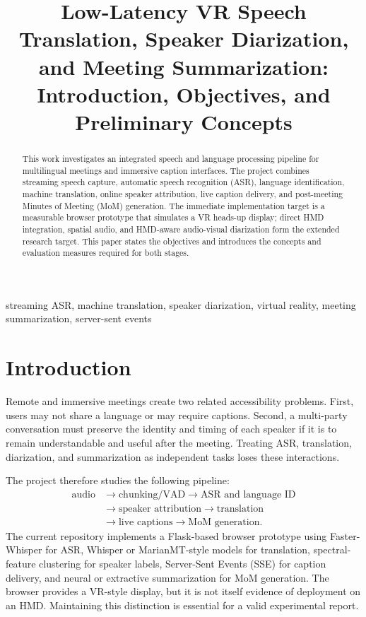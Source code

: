 \documentclass[conference]{IEEEtran}
\title{Low-Latency VR Speech Translation, Speaker Diarization, and Meeting Summarization: Introduction, Objectives, and Preliminary Concepts}
\author{
\IEEEauthorblockN{Abhiraj Bhatta (23BAI0089), Piyush Priyadarsi Panda (23BAI0134), Rajesh Mundhe (23BAI0112),\\
Varun Suresh (23BAI0097), and Simran Rawat (23BAI0090)}
\IEEEauthorblockA{Vellore Institute of Technology, Vellore, Tamil Nadu, India}
}
\begin{document}
\maketitle

\begin{abstract}
This work investigates an integrated speech and language processing pipeline for multilingual meetings and immersive caption interfaces. The project combines streaming speech capture, automatic speech recognition (ASR), language identification, machine translation, online speaker attribution, live caption delivery, and post-meeting Minutes of Meeting (MoM) generation. The immediate implementation target is a measurable browser prototype that simulates a VR heads-up display; direct HMD integration, spatial audio, and HMD-aware audio-visual diarization form the extended research target. This paper states the objectives and introduces the concepts and evaluation measures required for both stages.
\end{abstract}

\begin{IEEEkeywords}
streaming ASR, machine translation, speaker diarization, virtual reality, meeting summarization, server-sent events
\end{IEEEkeywords}

\section{Introduction}
Remote and immersive meetings create two related accessibility problems. First, users may not share a language or may require captions. Second, a multi-party conversation must preserve the identity and timing of each speaker if it is to remain understandable and useful after the meeting. Treating ASR, translation, diarization, and summarization as independent tasks loses these interactions.

The project therefore studies the following pipeline:
\begin{equation}
\begin{split}
\text{audio} &\rightarrow \text{chunking/VAD} \rightarrow \text{ASR and language ID}\\
&\rightarrow \text{speaker attribution} \rightarrow \text{translation}\\
&\rightarrow \text{live captions} \rightarrow \text{MoM generation}.
\end{split}
\end{equation}
The current repository implements a Flask-based browser prototype using Faster-Whisper for ASR, Whisper or MarianMT-style models for translation, spectral-feature clustering for speaker labels, Server-Sent Events (SSE) for caption delivery, and neural or extractive summarization for MoM generation. The browser provides a VR-style display, but it is not itself evidence of deployment on an HMD. Maintaining this distinction is essential for a valid experimental report.
\end{document}
